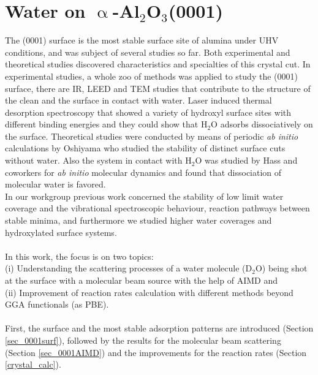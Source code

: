\documentclass[11pt,DIV=13,BCOR=5mm,a4paper,headinclude]{scrbook}
\begin{document}
\chapter{Water on $\upalpha$-Al$_2$O$_3$(0001)}\label{sec:0001}
The (0001) surface is the most stable surface site of alumina under UHV conditions, and was subject of several studies so far\cite{kuri10,hass98,hass00,Elam1998,Brown1999,Kelber2007}.
Both experimental and theoretical studies discovered characteristics and specialties of this crystal cut.
In experimental studies, a whole zoo of methods was applied to study the (0001) surface, there are IR\cite{Tsyganenko1996}, LEED\cite{Chang1971} and TEM\cite{Lee1985} studies that contribute to the structure of the clean and the surface in contact with water.
Laser induced thermal desorption spectroscopy\cite{Elam1998,Nelson1998} that showed a variety of hydroxyl surface sites with different binding energies and they could show that H$_2$O adsorbs dissociatively on the surface.
Theoretical studies were conducted by means of periodic \textit{ab initio} calculations by Oshiyama\cite{kuri10} who studied the stability of distinct surface cuts without water. Also the system in contact with H$_2$O was studied by Hass and coworkers\cite{hass98,hass00} for \textit{ab initio} molecular dynamics and found that dissociation of molecular water is favored.
\\
In our workgroup previous work concerned the stability of low limit water coverage and the vibrational spectroscopic behaviour, reaction pathways between stable minima, and furthermore we studied higher water coverages and hydroxylated surface systems\cite{WirthJPCC2012,Wirth2014,Wirth2015}.
\\\\
In this work, the focus is on two topics:
\\
(i) Understanding the scattering processes of a water molecule (D$_2$O) being shot at the surface with a molecular beam source with the help of AIMD and
\\
(ii) Improvement of reaction rates calculation with different methods beyond GGA functionals (as PBE).
\\\\
First, the surface and the most stable adsorption patterns are introduced (Section \ref{sec_0001surf}), followed by the results for the molecular beam scattering\cite{Heiden0001_2018} (Section \ref{sec_0001AIMD}) and the improvements for the reaction rates (Section \ref{crystal_calc}).
	
\end{document}
